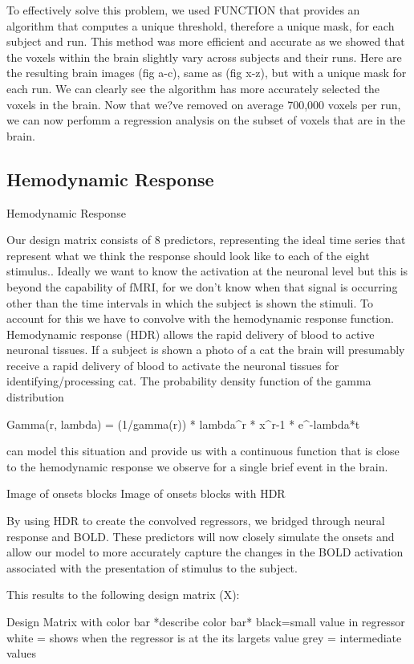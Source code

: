 \documentclass[11pt]{article}
\begin{document}
To effectively solve this problem, we used FUNCTION that provides an algorithm that computes a unique threshold, therefore a unique mask, for each subject and run. This method was more efficient and accurate as we showed that the voxels within the brain slightly vary  across subjects and their runs. Here are the resulting brain images (fig a-c), same as (fig x-z), but with a unique mask for each run. We can clearly see the algorithm has  more accurately selected the voxels in the brain. Now that we?ve removed on average 700,000 voxels per run, we can now perfomm a regression analysis on the subset of voxels that are in the brain.              
\subsection{Hemodynamic Response}
Hemodynamic Response

Our design matrix consists of 8 predictors, representing the ideal time series that represent what we think the response should look like to each of the eight stimulus.. Ideally we want to know the activation at the neuronal level but this is beyond the capability of fMRI, for we don’t know when that signal is occurring other than the time intervals in which the subject is shown the stimuli. To account for this we have to convolve with the hemodynamic response function. Hemodynamic response (HDR) allows the rapid delivery of blood to active neuronal tissues. If a subject is shown a photo of a cat the brain will presumably receive a rapid delivery of blood to activate the neuronal tissues for identifying/processing cat. The probability density function of the gamma distribution
  
           Gamma(r, lambda) = (1/gamma(r)) * lambda^r * x^r-1 * e^-lambda*t

can model this situation and provide us with a continuous function that is close to the hemodynamic response we observe for a single brief event in the brain.

          Image of onsets blocks
        Image of onsets blocks with HDR

By using HDR to create the convolved regressors, we bridged through neural response and BOLD. These predictors will now closely simulate the onsets and allow our model to more accurately capture the changes in the BOLD activation associated with the presentation of stimulus to the subject.


  This results to the following design matrix (X):

                                       Design Matrix with color bar  *describe color bar*
                                       black=small value in regressor
                                       white = shows when the regressor is at the its largets value
           grey = intermediate values
\end{document}
